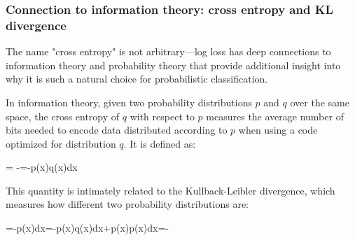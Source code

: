 \begin{center}
\end{center}

\subsubsection*{Connection to information theory: cross entropy and KL divergence}

The name "cross entropy" is not arbitrary—log loss has deep connections to information theory and probability theory that provide additional insight into why it is such a natural choice for probabilistic classification.

In information theory, given two probability distributions $p$ and $q$ over the same space, the \alert{cross entropy} of $q$ with respect to $p$ measures the average number of bits needed to encode data distributed according to $p$ when using a code optimized for distribution $q$. It is defined as:
\begin{myequation}
 = -=-\int p(x)\log q(x)dx
\end{myequation}

This quantity is intimately related to the \alert{Kullback-Leibler divergence}, which measures how different two probability distributions are:
\begin{myequation}
=-\int p(x)\log{}dx=-\int p(x)\log q(x)dx+\int p(x)\log p(x)dx=-
\end{myequation}

